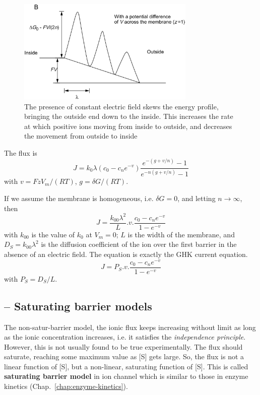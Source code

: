 \begin{enumerate}
  \begin{figure}[hbt]
    \centerline{\includegraphics[height=5cm,
      angle=0]{./images/with-E.eps}}
    \caption{The presence of constant electric field skews the energy
      profile, bringing the outside end down to the inside. This increases
      the rate at which positive ions moving from inside to outside, and
      decreases the movement from outside to inside}
    \label{fig:with_E}
  \end{figure}

  The flux is
  \begin{equation}
    \label{eq:1401}
    J = k_0\lambda(c_0-c_ne^{-v})\frac{e^{-(g+v/n)}-1}{e^{-n(g+v/n)}-1}
  \end{equation}
  with $v=FzV_m/(RT)$, $g=\delta G/(RT)$.

\end{enumerate}

If we assume the membrane is homogeneous, i.e. $\delta G=0$, and
letting $n\rightarrow \infty$, then
\begin{equation}
  \label{eq:1402}
  J=\frac{k_{00}\lambda^2}{L}.v.\frac{c_0-c_ne^{-v}}{1-e^{-v}}
\end{equation}
with $k_{00}$ is the value of $k_0$ at $V_m=0$; $L$ is the width of
the membrane, and $D_S=k_{00}\lambda^2$ is the diffusion coefficient of
the ion over the first barrier in the absence of an electric
field. The equation is exactly the GHK current equation.
\begin{equation}
  \label{eq:1403}
  J=P_S.v.\frac{c_0-c_ne^{-v}}{1-e^{-v}}
\end{equation}
with $P_S=D_S/L$.


\subsection{-- Saturating barrier models}
\label{sec:satur-barr-models}

The non-satur-barrier model, the ionic flux keeps increasing without
limit as long as the ionic concentration increases, i.e. it satisfies
the {\it independence principle}. However, this is not usually found
to be true experimentally. The flux should saturate, reaching some
maximum value as [S] gets large. So, the flux is not a linear function
of [S], but a non-linear, saturating function of [S].  This is called
{\bf saturating barrier model} in ion channel which is similar to
those in enzyme kinetics (Chap.~\ref{chap:enzyme-kinetics}).

